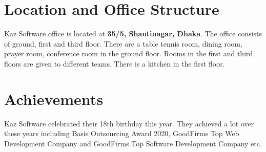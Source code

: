 \section{Location and Office Structure}

Kaz Software office is located at \textbf{35/5, Shantinagar, Dhaka}.
The office consists of ground, first and third floor.
There are a table tennis room, dining room, prayer room, conference room in the ground floor.
Rooms in the first and third floors are given to different teams.
There is a kitchen in the first floor.

\section{Achievements}

Kaz Software celebrated their 18th birthday this year.
They achieved a lot over these years including Basis Outsourcing Award 2020, GoodFirms Top Web Development Company and GoodFirms Top Software Development Company etc.
